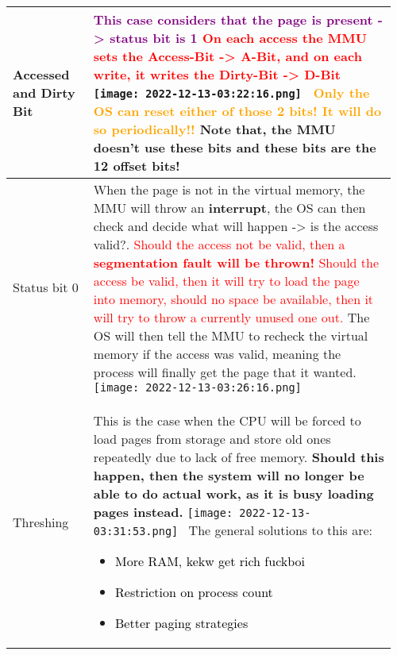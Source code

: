 \documentclass[main.tex,fontsize=8pt,paper=a4,paper=portrait,DIV=calc,]{scrartcl}
\begin{document}
\begin{table}[ht!]
\begin{tabular}{|m{0.2\linewidth}|m{0.755\linewidth}|}
\hline
Accessed and Dirty Bit &
\textcolor{purple}{This case considers that the page is present -> status bit is 1}\newline
\textcolor{red}{On each \textbf{access the MMU sets the Access-Bit -> A-Bit}, and on each \textbf{write, it writes the Dirty-Bit -> D-Bit}}\newline
\texttt{[image: 2022-12-13-03:22:16.png]}
\, \newline
\textcolor{orange}{\textbf{Only the OS can reset either of those 2 bits! It will do so \textbf{periodically!!}}}\newline 
Note that, the MMU doesn't use these bits and these bits are the 12 offset bits!\\
\hline
Status bit 0 & 
When the page is not in the virtual memory, the MMU will throw an \textbf{interrupt}, the OS can then check and decide what will happen -> is the access valid?.\newline
\textcolor{red}{Should the access not be valid, then a \textbf{segmentation fault will be thrown!}\newline
Should the access be valid, then it will try to load the page into memory, should no space be available, then it will try to throw a currently unused one out.}\newline
The OS will then tell the MMU to recheck the virtual memory if the access was valid, meaning the process will finally get the page that it wanted.\newline
\texttt{[image: 2022-12-13-03:26:16.png]}\\
\hline
Threshing & 
This is the case when the CPU will be forced to load pages from storage and store old ones repeatedly due to lack of free memory.\newline
\textbf{Should this happen, then the system will no longer be able to do actual work, as it is busy loading pages instead.}\newline
\texttt{[image: 2022-12-13-03:31:53.png]}
\, \newline
The general solutions to this are: \newline
\begin{itemize}
\item \textcolor{black}{More RAM, kekw get rich fuckboi}
\item \textcolor{black}{Restriction on process count}
\item \textcolor{black}{Better paging strategies}

\end{itemize}
\end{tabular}
\end{table}
\end{document}
